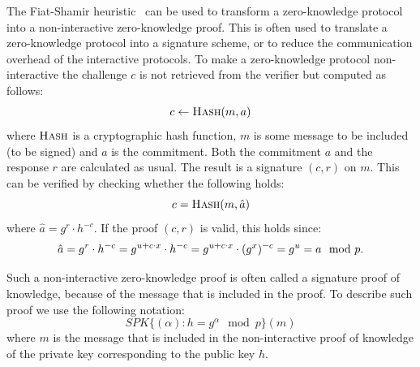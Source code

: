 The Fiat-Shamir heuristic~\cite{FiatShamir1987} can be used to transform a
zero-knowledge protocol into a non-interactive zero-knowledge proof. This is
often used to translate a zero-knowledge protocol into a signature scheme, or to
reduce the communication overhead of the interactive protocols. To make a
zero-knowledge protocol non-interactive the challenge $c$ is not retrieved from
the verifier but computed as follows:
\begin{equation*}
  c \gets \Call{Hash}{m, a}
\end{equation*}
where $\Call{Hash}{}$ is a cryptographic hash function, $m$ is some message to
be included (to be signed) and $a$ is the commitment. Both the commitment $a$
and the response $r$ are calculated as usual. The result is a signature $(c, r)$
on $m$. This can be verified by checking whether the following holds:
\begin{equation*}
  c = \Call{Hash}{m, \hat{a}}
\end{equation*}
where $\hat{a} = g^r \cdot h^{-c}$. If the proof $(c, r)$ is valid, this holds
since:
\begin{equation*}
  \hat{a} = g^r \cdot h^{-c} = g^{u + c \cdot x} \cdot h^{-c} = g^{u + c\cdot x} \cdot (g^x)^{-c} = g^u = a \mod p\text.
\end{equation*}

Such a non-interactive zero-knowledge proof is often called a signature proof of
knowledge, because of the message that is included in the proof. To describe
such proof we use the following notation:
\begin{equation*}
  SPK\{(\alpha) : h = g^{\alpha} \mod p \}(m)
\end{equation*}
where $m$ is the message that is included in the non-interactive proof of
knowledge of the private key corresponding to the public key $h$.